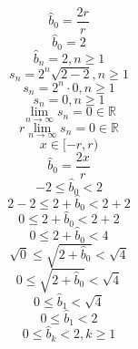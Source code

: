 \documentclass[a4paper,12pt]{report}
\begin{document}
\begin{equation}
\hat{b}_0 = \frac{2r}{r}
\end{equation}
\begin{equation}
\hat{b}_0 = 2
\end{equation}
\begin{equation}
\hat{b}_n = 2, n \geq 1
\end{equation}
\begin{equation}
s_n = 2^n \sqrt{2 - 2}, n \geq 1
\end{equation}
\begin{equation}
s_n = 2^n \cdot 0, n \geq 1
\end{equation}
\begin{equation}
s_n = 0, n \geq 1
\end{equation}
\begin{equation}
\lim \limits_{n \to \infty} s_n = 0 \in \mathbb{R}
\end{equation}
\begin{equation}
r \lim \limits_{n \to \infty} s_n = 0 \in \mathbb{R}
\end{equation}
\begin{equation}
x \in [-r,r)
\end{equation}
\begin{equation}
\hat{b}_0 = \frac{2x}{r}
\end{equation}
\begin{equation}
-2 \leq \hat{b}_0 < 2
\end{equation}
\begin{equation}
2 - 2 \leq 2 + \hat{b}_0 < 2 + 2
\end{equation}
\begin{equation}
0 \leq 2 + \hat{b}_0 < 2 + 2
\end{equation}
\begin{equation}
0 \leq 2 + \hat{b}_0 < 4
\end{equation}
\begin{equation}
\sqrt{0} \leq \sqrt{2 + \hat{b}_0} < \sqrt{4}
\end{equation}
\begin{equation}
0 \leq \sqrt{2 + \hat{b}_0} < \sqrt{4}
\end{equation}
\begin{equation}
0 \leq \hat{b}_1 < \sqrt{4}
\end{equation}
\begin{equation}
0 \leq \hat{b}_1 < 2
\end{equation}
\begin{equation}
0 \leq \hat{b}_k < 2, k \geq 1
\end{equation}
\end{document}
